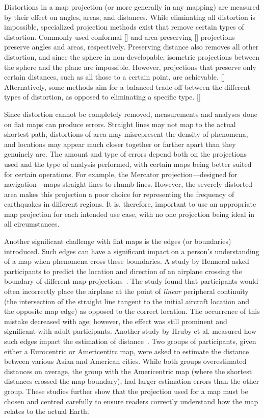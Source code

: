 Distortions in a map projection (or more generally in any mapping) are measured by their effect on angles, areas, and distances.
While eliminating all distortion is impossible, specialized projection methods exist that remove certain types of distortion.
Commonly used conformal [] and area-preserving [] projections preserve angles and areas, respectively.
Preserving distance also removes all other distortion, and since the sphere in non-developable, isometric projections between the sphere and the plane are impossible.
However, projections that preserve only certain distances, such as all those to a certain point, are achievable. []
Alternatively, some methods aim for a balanced trade-off between the different types of distortion, as opposed to eliminating a specific type. []
\cite{mathematics paper on distortion}
\cite{planar area preserving}
\cite{planar conformal}


Since distortion cannot be completely removed, measurements and analyses done on flat maps can produce errors.
Straight lines may not map to the actual shortest path, distortions of area may misrepresent the density of phenomena, and locations may appear much closer together or farther apart than they genuinely are.
The amount and type of errors depend both on the projections used and the type of analysis performed, with certain maps being better suited for certain operations.
For example, the Mercator projection---designed for navigation---maps straight lines to rhumb lines.
However, the severely distorted area makes this projection a poor choice for representing the frequency of earthquakes in different regions.
It is, therefore, important to use an appropriate map projection for each intended use case, with no one projection being ideal in all circumstances.


Another significant challenge with flat maps is the edges (or boundaries) introduced.
Such edges can have a significant impact on a person's understanding of a map when phenomena cross these boundaries.
A study by Henneral asked participants to predict the location and direction of an airplane crossing the boundary of different map projections~\cite{hennerdal2015beyond}.
The study found that participants would often incorrectly place the airplane at the point of \textit{linear} peripheral continuity (the intersection of the straight line tangent to the initial aircraft location and the opposite map edge) as opposed to the correct location.
The occurrence of this mistake decreased with age; however, the effect was still prominent and significant with adult participants. Another study by Hruby et al. measured how such edges impact the estimation of distance~\cite{hruby2016journey}.
Two groups of participants, given either a Eurocentric or Americentirc map, were asked to estimate the distance between various Asian and American cities.
While both groups overestimated distances on average, the group with the Americentric map (where the shortest distances crossed the map boundary), had larger estimation errors than the other group.
These studies further show that the projection used for a map must be chosen and centred carefully to ensure readers correctly understand how the map relates to the actual Earth.


